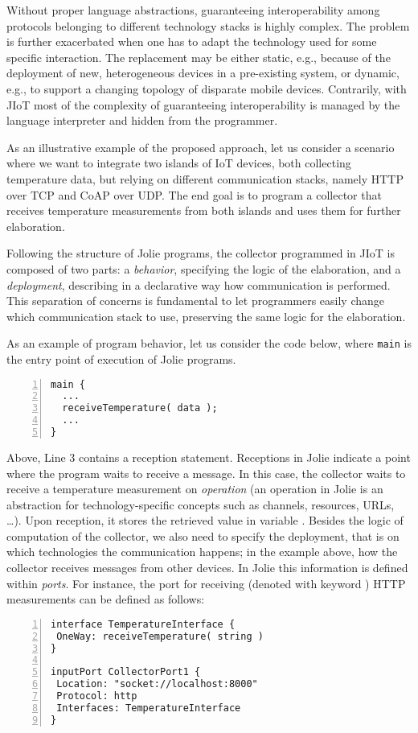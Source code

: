 Without proper language abstractions, guaranteeing interoperability among
protocols belonging to different technology stacks is highly complex. The problem is
further exacerbated when one has to adapt the technology used for some specific
interaction. The replacement may be either static, e.g., because of the
deployment of new, heterogeneous devices in a pre-existing system, or dynamic,
e.g., to support a changing topology of disparate mobile devices. Contrarily,
with JIoT most of the complexity of guaranteeing interoperability is managed by
the language interpreter and hidden from the programmer.

As an illustrative example of the proposed approach, let us consider a scenario
where we want to integrate two islands of IoT devices, both collecting
temperature data, but relying on different communication stacks, namely HTTP
over TCP and CoAP over UDP.
%
The end goal is to program a collector that receives temperature measurements
from both islands and uses them for further elaboration.

Following the structure of Jolie programs, the collector programmed in JIoT is
composed of two parts: a \emph{behavior}, specifying the logic of the
elaboration, and a \emph{deployment}, describing in a declarative way how
communication is performed. This separation of concerns is fundamental to let
programmers easily change which communication stack to use, preserving the same
logic for the elaboration.

As an example of program behavior, let us consider the code below, where \lstinline{main} is the entry point of execution of Jolie programs.
%
\begin{lstlisting}[numbers=left,basicstyle=\footnotesize\ttfamily]
main {
  ...
  receiveTemperature( data );
  ...
}
\end{lstlisting}
%
Above, Line 3 contains a reception statement. 
Receptions in Jolie indicate a
point where the program waits to receive a message. 
In this case, the collector
waits to receive a temperature measurement on \emph{operation}
 (an operation in Jolie is an abstraction for
technology-specific concepts such as channels, resources, URLs,
\dots). Upon reception, it stores the retrieved value in variable .
%
Besides the logic of computation of the collector, we also need to specify the deployment, that is on
which technologies the communication happens; in the example above, how the
collector receives messages from other devices. In Jolie this information is
defined within \emph{ports}. For instance, the port for receiving (denoted with
keyword ) HTTP measurements can be defined as follows:
%
\newline
\begin{lstlisting}[numbers=left,basicstyle=\ttfamily\footnotesize,caption=Example of interface
and input port in Jolie.]
interface TemperatureInterface {
 OneWay: receiveTemperature( string )
}

inputPort CollectorPort1 {
 Location: "socket://localhost:8000"
 Protocol: http
 Interfaces: TemperatureInterface
}
\end{lstlisting}

